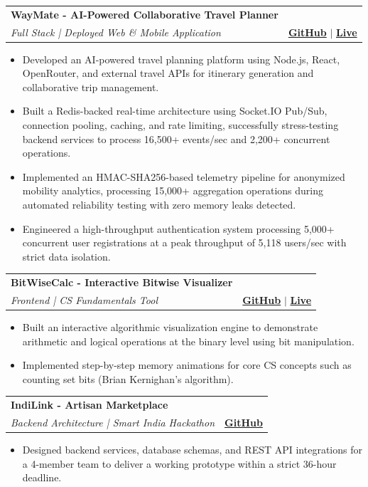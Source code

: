 \documentclass[a4paper,10pt]{article}
\makeatletter
\newcommand{\resumeProject}[4]{
\vspace{0.5mm}\item
    \begin{tabular*}{0.98\textwidth}[t]{l@{\extracolsep{\fill}}r}
        \textbf{#1} & \textit{\footnotesize{#3}} \\
        \footnotesize{\textit{#2}} & \footnotesize{#4}
    \end{tabular*}
    \vspace{-2.4mm}
}
\newcommand{\resumeItemListStart}{\begin{justify}\begin{itemize}[leftmargin=3ex, rightmargin=2ex, noitemsep,labelsep=1.2mm,itemsep=3pt,parsep=0pt]\small}
\newcommand{\resumeItemListEnd}{\end{itemize}\end{justify}\vspace{-2mm}}
\makeatother
\begin{document}
    \resumeProject
      {WayMate - AI-Powered Collaborative Travel Planner} 
      {Full Stack | Deployed Web \& Mobile Application} 
      {} 
      {\href{https://github.com/ankitsingh794/waymate}{\textbf{GitHub}} $|$ \href{https://waymate.vercel.app/}{\textbf{Live}}} 
      \resumeItemListStart
        \item {Developed an AI-powered travel planning platform using Node.js, React, OpenRouter, and external travel APIs for itinerary generation and collaborative trip management.}
        \item {Built a Redis-backed real-time architecture using Socket.IO Pub/Sub, connection pooling, caching, and rate limiting, successfully stress-testing backend services to process 16,500+ events/sec and 2,200+ concurrent operations.}
        \item {Implemented an HMAC-SHA256-based telemetry pipeline for anonymized mobility analytics, processing 15,000+ aggregation operations during automated reliability testing with zero memory leaks detected.}
        \item {Engineered a high-throughput authentication system processing 5,000+ concurrent user registrations at a peak throughput of 5,118 users/sec with strict data isolation.}
      \resumeItemListEnd
    
     \vspace{-1mm}
     
    \resumeProject
      {BitWiseCalc - Interactive Bitwise Visualizer} 
      {Frontend | CS Fundamentals Tool} 
      {} 
      {\href{https://github.com/ankitsingh794/bitwisecalc}{\textbf{GitHub}} $|$ \href{https://bit-wise-calc.vercel.app/}{\textbf{Live}}} 
      \resumeItemListStart
        \item {Built an interactive algorithmic visualization engine to demonstrate arithmetic and logical operations at the binary level using bit manipulation.}
        \item {Implemented step-by-step memory animations for core CS concepts such as counting set bits (Brian Kernighan's algorithm).}
    \resumeItemListEnd
      
     \vspace{-1mm}
     
    \resumeProject
      {IndiLink - Artisan Marketplace} 
      {Backend Architecture | Smart India Hackathon} 
      {} 
      {\href{https://github.com/ankitsingh794/indilink}{\textbf{GitHub}}} 
      \resumeItemListStart
        \item {Designed backend services, database schemas, and REST API integrations for a 4-member team to deliver a working prototype within a strict 36-hour deadline.}
      \resumeItemListEnd
\end{document}

